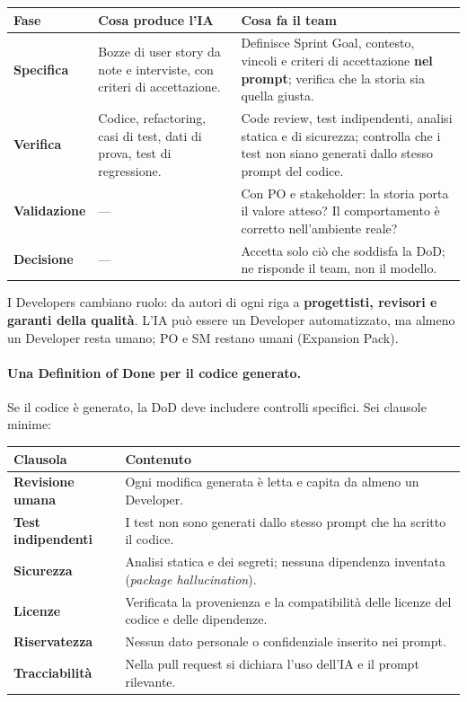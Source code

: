 \documentclass[12pt]{extarticle}
\begin{document}
\begin{center}
\small
\begin{tabular}{p{2.8cm}p{5.4cm}p{7.0cm}}
    \toprule
    \textbf{Fase} & \textbf{Cosa produce l'IA} & \textbf{Cosa fa il team} \\
    \midrule
    \textbf{Specifica} & Bozze di user story da note e interviste, con criteri di accettazione. & Definisce Sprint Goal, contesto, vincoli e criteri di accettazione \textbf{nel prompt}; verifica che la storia sia quella giusta. \\
    \addlinespace
    \textbf{Verifica} & Codice, refactoring, casi di test, dati di prova, test di regressione. & Code review, test indipendenti, analisi statica e di sicurezza; controlla che i test non siano generati dallo stesso prompt del codice. \\
    \addlinespace
    \textbf{Validazione} & --- & Con PO e stakeholder: la storia porta il valore atteso? Il comportamento è corretto nell'ambiente reale? \\
    \addlinespace
    \textbf{Decisione} & --- & Accetta solo ciò che soddisfa la DoD; ne risponde il team, non il modello. \\
    \bottomrule
\end{tabular}
\end{center}

\noindent I Developers cambiano ruolo: da autori di ogni riga a \textbf{progettisti, revisori e garanti della qualità}. L'IA può essere un Developer automatizzato, ma almeno un Developer resta umano; PO e SM restano umani (Expansion Pack).

\paragraph{Una Definition of Done per il codice generato.}
Se il codice è generato, la DoD deve includere controlli specifici. Sei clausole minime:
\begin{center}
\small
\begin{tabular}{p{3.4cm}p{11.6cm}}
    \toprule
    \textbf{Clausola} & \textbf{Contenuto} \\
    \midrule
    \textbf{Revisione umana} & Ogni modifica generata è letta e capita da almeno un Developer. \\
    \addlinespace
    \textbf{Test indipendenti} & I test non sono generati dallo stesso prompt che ha scritto il codice. \\
    \addlinespace
    \textbf{Sicurezza} & Analisi statica e dei segreti; nessuna dipendenza inventata (\textit{package hallucination}). \\
    \addlinespace
    \textbf{Licenze} & Verificata la provenienza e la compatibilità delle licenze del codice e delle dipendenze. \\
    \addlinespace
    \textbf{Riservatezza} & Nessun dato personale o confidenziale inserito nei prompt. \\
    \addlinespace
    \textbf{Tracciabilità} & Nella pull request si dichiara l'uso dell'IA e il prompt rilevante. \\
    \bottomrule
\end{tabular}
\end{center}
\end{document}
